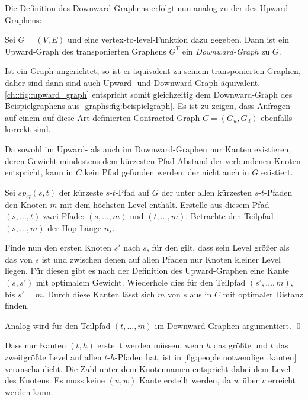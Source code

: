 Die Definition des Downward-Graphens erfolgt nun analog zu der des Upward-Graphens:

\begin{definition}
  Sei $G = (V, E)$ und eine vertex-to-level-Funktion dazu gegeben. Dann ist ein Upward-Graph des transponierten Graphens $G^T$ ein \emph{Downward-Graph} zu $G$.
\end{definition}

Ist ein Graph ungerichtet, so ist er äquivalent zu seinem transponierten Graphen, daher sind dann sind auch Upward- und Downward-Graph äquivalent.
\autoref{ch::fig::upward_graph} entspricht somit gleichzeitig dem Downward-Graph des Beispielgraphens aus \autoref{graphs:fig:beispielgraph}.
Es ist zu zeigen, dass Anfragen auf einem auf diese Art definierten Contracted-Graph $C = (G_u, G_d)$ ebenfalls korrekt sind.

\begin{beweis}
  Da sowohl im Upward- als auch im Downward-Graphen nur Kanten existieren, deren Gewicht mindestens dem kürzesten Pfad Abstand der verbundenen Knoten entspricht, kann in $C$ kein Pfad gefunden werden, der nicht auch in $G$ existiert.

  Sei ${sp}_G(s, t)$ der kürzeste $s$-$t$-Pfad auf $G$ der unter allen kürzesten $s$-$t$-Pfaden den Knoten $m$ mit dem höchsten Level enthält.
  Erstelle aus diesem Pfad $(s, \dotsc, t)$ zwei Pfade: $(s, \dotsc, m)$ und $(t, \dotsc, m)$.
  Betrachte den Teilpfad $(s, \dotsc, m)$ der Hop-Länge $n_s$.

  Finde nun den ersten Knoten $s'$ nach $s$, für den gilt, dass sein Level größer als das von $s$ ist und zwischen denen auf allen Pfaden nur Knoten kleiner Level liegen.
  Für diesen gibt es nach der Definition des Upward-Graphen eine Kante $(s, s')$ mit optimalem Gewicht.
  Wiederhole dies für den Teilpfad $(s', \dotsc, m)$, bis $s' = m$.
  Durch diese Kanten lässt sich $m$ von $s$ aus in $C$ mit optimaler Distanz finden.

  Analog wird für den Teilpfad $(t, \dotsc, m)$ im Downward-Graphen argumentiert.
  \qed
\end{beweis}

Dass nur Kanten $(t, h)$ erstellt werden müssen, wenn $h$ das größte und $t$ das zweitgrößte Level auf allen $t$-$h$-Pfaden hat, ist in \autoref{fig:people:notwendige_kanten} veranschaulicht.
Die Zahl unter dem Knotennamen entspricht dabei dem Level des Knotens.
Es muss keine $(u, w)$ Kante erstellt werden, da $w$ über $v$ erreicht werden kann.

